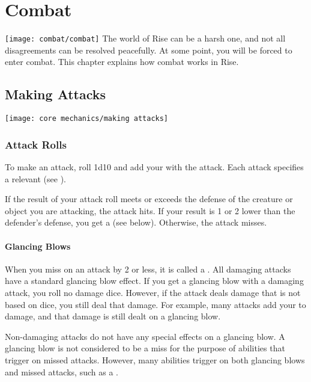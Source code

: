 \chapter{Combat}\label{Combat}
    \texttt{[image: combat/combat]}
    The world of Rise can be a harsh one, and not all disagreements can be resolved peacefully.
    At some point, you will be forced to enter combat.
    This chapter explains how combat works in Rise.

\section{Making Attacks}\label{Attacks}
    \texttt{[image: core mechanics/making attacks]}

    \subsection{Attack Rolls}\label{Attack Rolls}
        To make an attack, roll 1d10 and add your  with the attack.
        Each attack specifies a relevant  (see ).

        If the result of your attack roll meets or exceeds the defense of the creature or object you are attacking, the attack hits.
        If your result is 1 or 2 lower than the defender's defense, you get a  (see below).
        Otherwise, the attack misses.

        \subsubsection{Glancing Blows}\label{Glancing Blows}
            When you miss on an attack by 2 or less, it is called a .
            All damaging attacks have a standard glancing blow effect.
            If you get a glancing blow with a damaging attack, you roll no damage dice.
            However, if the attack deals damage that is not based on dice, you still deal that damage.
            For example, many attacks add your  to damage, and that damage is still dealt on a glancing blow.

            Non-damaging attacks do not have any special effects on a glancing blow.
            A glancing blow is not considered to be a miss for the purpose of abilities that trigger on missed attacks.
            However, many abilities trigger on both glancing blows and missed attacks, such as a .

